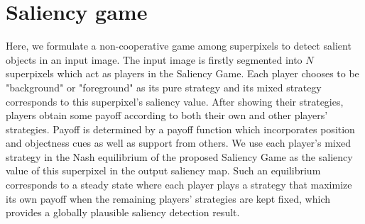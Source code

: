 \documentclass[journal]{IEEEtran}
\begin{document}
\section{Saliency game}\label{section:my}
Here, we formulate a non-cooperative game among superpixels to detect salient objects in an input image. The input image is firstly segmented into $N$ superpixels which act as players in the Saliency Game. Each player chooses to be "background" or "foreground" as its pure strategy and its mixed strategy corresponds to this superpixel's saliency value. After showing their strategies, players obtain some payoff according to both their own and other players' strategies. Payoff is determined by a payoff function which incorporates position and objectness cues as well as support from others. We use each player's mixed strategy in the Nash equilibrium of the proposed Saliency Game as the saliency value of this superpixel in the output saliency map. Such an equilibrium corresponds to a steady state where each player plays a strategy that maximize its own payoff when the remaining players' strategies are kept fixed, which provides a globally plausible saliency detection result.%
\end{document}
